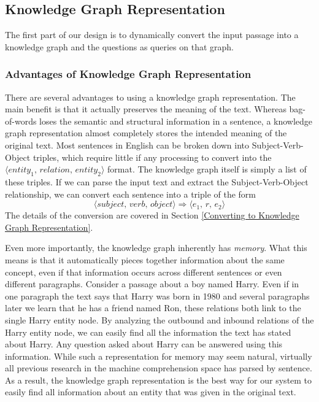 \documentclass[pageno]{final_paper}
\begin{document}
\subsection{Knowledge Graph Representation}
\label{Knowledge Graph Representation}

The first part of our design is to dynamically convert the input passage into a
knowledge graph and the questions as queries on that graph. \\

\subsubsection{Advantages of Knowledge Graph Representation}
\label{Advantages of Knowledge Graph Representation}

There are several advantages to using a knowledge graph representation. The main
benefit is that it actually preserves the meaning of the text. Whereas
bag-of-words loses the semantic and structural information in a sentence, a
knowledge graph representation almost completely stores the intended meaning of
the original text. Most sentences in English can be broken down into
Subject-Verb-Object triples, which require little if any processing to convert
into the $\langle \textit{entity}_1, \, \textit{relation}, \, \textit{entity}_2
\rangle$ format. The knowledge graph itself is simply a list of these triples.
If we can parse the input text and extract the Subject-Verb-Object relationship,
we can convert each sentence into a triple of the form
$$\langle \textit{subject}, \, \textit{verb}, \, \textit{object} \rangle
\Rightarrow \langle e_1, \, r, \, e_2 \rangle$$
The details of the conversion are covered in Section \ref{Converting to
Knowledge Graph Representation}.

Even more importantly, the knowledge graph inherently has \textit{memory}. What
this means is that it automatically pieces together information about the same
concept, even if that information occurs across different sentences or even
different paragraphs. Consider a passage about a boy named Harry. Even if in one
paragraph the text says that Harry was born in 1980 and several paragraphs later
we learn that he has a friend named Ron, these relations both link to the single
Harry entity node. By analyzing the outbound and inbound relations of the Harry
entity node, we can easily find all the information the text has stated about
Harry. Any question asked about Harry can be answered using this information.
While such a representation for memory may seem natural, virtually all previous
research in the machine comprehension space has parsed by sentence. As a result,
the knowledge graph representation is the best way for our system to easily find
all information about an entity that was given in the original text.
\end{document}
